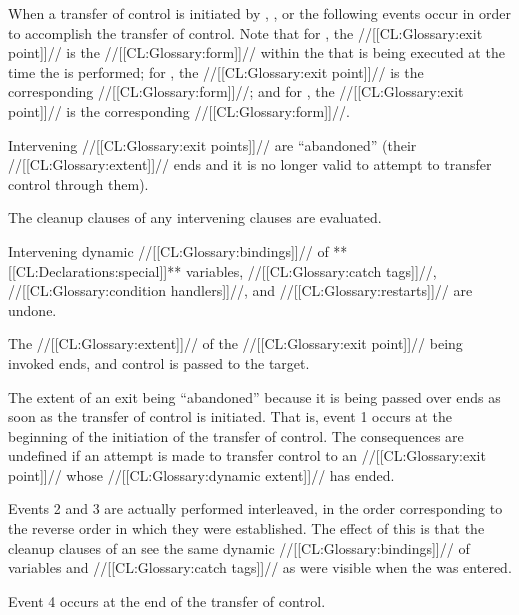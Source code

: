 







When a transfer of control is initiated by , 
, or 
the following events occur in order to accomplish the transfer of control.
Note that for , 
the //[[CL:Glossary:exit point]]// is the //[[CL:Glossary:form]]// within the 
that is being executed at the time the  is performed;
for ,
the //[[CL:Glossary:exit point]]// is the corresponding 
 //[[CL:Glossary:form]]//;
and for ,
the //[[CL:Glossary:exit point]]// is the corresponding 
 //[[CL:Glossary:form]]//. 

\beginlist
{} 
 Intervening //[[CL:Glossary:exit points]]// are ``abandoned''
 (\ie their //[[CL:Glossary:extent]]// ends 
      and it is no longer valid to attempt to transfer control through them).

 The cleanup clauses of any intervening  clauses
 are evaluated.
 

 Intervening dynamic //[[CL:Glossary:bindings]]// of **[[CL:Declarations:special]]** variables,
 //[[CL:Glossary:catch tags]]//, //[[CL:Glossary:condition handlers]]//, and //[[CL:Glossary:restarts]]//
 are undone.
 
 The //[[CL:Glossary:extent]]// of the //[[CL:Glossary:exit point]]// being invoked ends,
 and control is passed to the target.
\endlist 
 
The extent of an exit being ``abandoned'' because it is being passed over
ends as soon as the transfer of control is initiated. That is,
event 1 occurs at the beginning of the initiation of the transfer of
control. 
The consequences are undefined if an attempt is made to transfer control 
to an //[[CL:Glossary:exit point]]// whose //[[CL:Glossary:dynamic extent]]// has ended.
 

Events 2 and 3 are actually performed interleaved, in the order
corresponding to the reverse order in which they were established.
The effect of this is that the cleanup clauses of an 
see the same dynamic //[[CL:Glossary:bindings]]// 
of variables and //[[CL:Glossary:catch tags]]// as were
visible when the  was entered.
 
Event 4 occurs at the end of the transfer of control.
 

